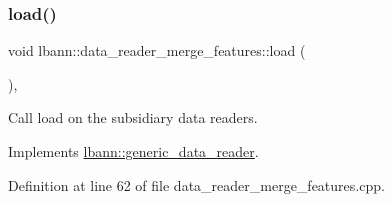 \subsubsection{\texorpdfstring{load()}{load()}}
{\footnotesize\ttfamily void lbann\+::data\+\_\+reader\+\_\+merge\+\_\+features\+::load (\begin{DoxyParamCaption}{ }\end{DoxyParamCaption})\hspace{0.3cm}{\ttfamily [override]}, {\ttfamily [virtual]}}



Call load on the subsidiary data readers. 



Implements \hyperlink{classlbann_1_1generic__data__reader_afeb47703d988a230a59859cbfc178215}{lbann\+::generic\+\_\+data\+\_\+reader}.



Definition at line 62 of file data\+\_\+reader\+\_\+merge\+\_\+features.\+cpp.


